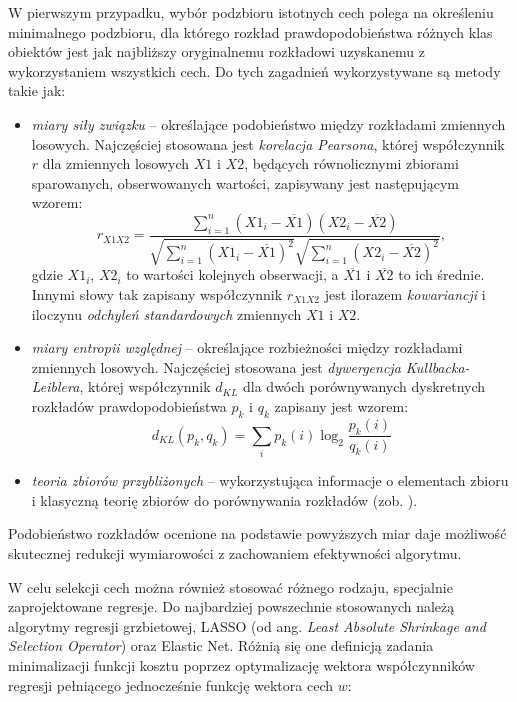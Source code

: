 W pierwszym przypadku, wybór podzbioru istotnych cech polega na określeniu minimalnego podzbioru, dla którego rozkład prawdopodobieństwa różnych klas obiektów jest jak najbliższy oryginalnemu rozkładowi uzyskanemu z wykorzystaniem wszystkich cech. Do tych zagadnień wykorzystywane są metody takie jak:
\begin{itemize}[noitemsep,nolistsep]
	\item \textit{miary siły związku} -- określające podobieństwo między rozkładami zmiennych losowych. Najczęściej stosowana jest \textit{korelacja Pearsona}, której współczynnik $r$ dla zmiennych losowych $X1$ i $X2$, będących równolicznymi zbiorami sparowanych, obserwowanych wartości, zapisywany jest następującym wzorem:
	\begin{equation}
	\label{PearsorR}
	r_{X1X2} = \frac{\sum_{i=1}^n (X1_i - \overline{X1})(X2_i - \overline{X2})}{\sqrt{\sum_{i=1}^n (X1_i - \overline{X1})^2} \sqrt{\sum_{i=1}^n (X2_i - \overline{X2})^2}},
	\end{equation}
	gdzie $X1_i$, $X2_i$ to wartości kolejnych obserwacji, a $\overline{X1}$ i $\overline{X2}$ to ich średnie. Innymi słowy tak zapisany współczynnik $r_{X1X2}$ jest ilorazem \textit{kowariancji} \linebreak i iloczynu \textit{odchyleń standardowych} zmiennych $X1$ i $X2$.
	\item \textit{miary entropii względnej} --  określające rozbieżności między rozkładami zmiennych losowych. Najczęściej stosowana jest \textit{dywergencja Kullbacka-Leiblera}, której współczynnik $d_{KL}$ dla dwóch porównywanych dyskretnych rozkładów prawdopodobieństwa $p_k$ i $q_k$ zapisany jest wzorem: 
	\begin{equation}
	d_{KL}(p_k, q_k) = \sum_{i} p_k(i) \log_2 \frac{p_k(i)}{q_k(i)}
	\end{equation}
	\item \textit{teoria zbiorów przybliżonych} -- wykorzystująca informacje o elementach zbioru i klasyczną teorię zbiorów do porównywania rozkładów (zob. \cite{Kowalik2003}).
\end{itemize}
Podobieństwo rozkładów ocenione na podstawie powyższych miar daje możliwość skutecznej redukcji wymiarowości z zachowaniem efektywności algorytmu.

W celu selekcji cech można również stosować różnego rodzaju, specjalnie zaprojektowane regresje. Do najbardziej powszechnie stosowanych należą algorytmy regresji grzbietowej, LASSO (od ang. \textit{Least Absolute Shrinkage and Selection Operator}) oraz Elastic Net. Różnią się one definicją zadania minimalizacji funkcji kosztu poprzez optymalizację wektora współczynników regresji pełniącego jednocześnie funkcję wektora cech $w$:  

